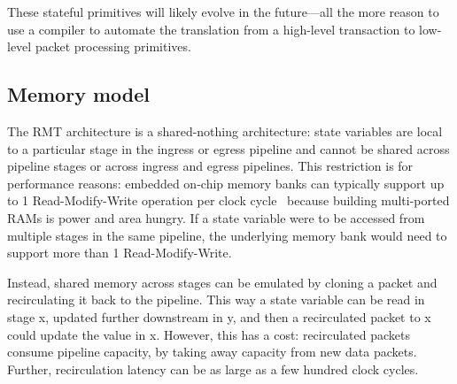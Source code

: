 
These stateful primitives will likely evolve in the future---all the more
reason to use a compiler to automate the translation from a high-level
transaction to low-level packet processing primitives.

\subsection{Memory model}

The RMT architecture is a shared-nothing architecture: state variables are
local to a particular stage in the ingress or egress pipeline and cannot be
shared across pipeline stages or across ingress and egress pipelines. This
restriction is for performance reasons: embedded on-chip memory banks can
typically support up to 1 Read-Modify-Write operation per clock
cycle~\cite{some_citation_from_memoir} because building multi-ported RAMs is
power and area hungry. If a state variable were to be accessed from multiple
stages in the same pipeline, the underlying memory bank would need to support
more than 1 Read-Modify-Write.

Instead, shared memory across stages can be emulated by cloning a packet and
recirculating it back to the pipeline. This way a state variable can be read in
stage x, updated further downstream in y, and then a recirculated packet to x
could update the value in x. However, this has a cost: recirculated packets
consume pipeline capacity, by taking away capacity from new data packets.
Further, recirculation latency can be as large as a few hundred clock cycles.
